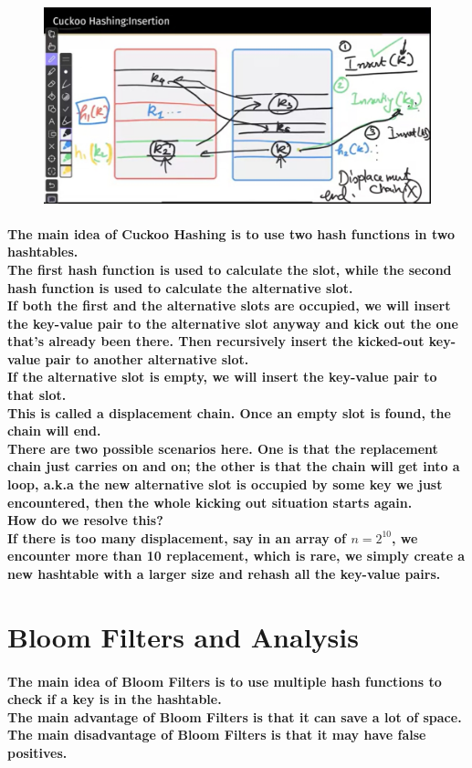 \documentclass{article}
\begin{document}
\begin{figure}[H]
    \includegraphics[width=\textwidth]{cuckoohashing.png}
\end{figure}

\paragraph{The main idea of Cuckoo Hashing is to use two hash functions in two hashtables.\\
The first hash function is used to calculate the slot, while the second hash function is
used to calculate the alternative slot.\\
If both the first and the alternative slots are occupied, we will insert the key-value pair to the alternative slot anyway 
and kick out the one that's already been there. Then recursively insert the kicked-out key-value pair to another alternative slot.\\
If the alternative slot is empty, we will insert the key-value pair to that slot.\\
This is called a displacement chain. Once an empty slot is found, the chain will end.\\
There are two possible scenarios here. One is that the replacement chain just carries on and on;
the other is that the chain will get into a loop, a.k.a the new alternative slot is occupied by some key we just encountered,
then the whole kicking out situation starts again.\\
How do we resolve this?\\
If there is too many displacement, say in an array of $n=2^{10}$, we encounter more than 10 replacement, which is rare, we simply 
create a new hashtable with a larger size and rehash all the key-value pairs.\\}


\section{Bloom Filters and Analysis}

\paragraph{The main idea of Bloom Filters is to use multiple hash functions to check if a key is in the hashtable.\\
The main advantage of Bloom Filters is that it can save a lot of space.\\
The main disadvantage of Bloom Filters is that it may have false positives.\\}
\end{document}
